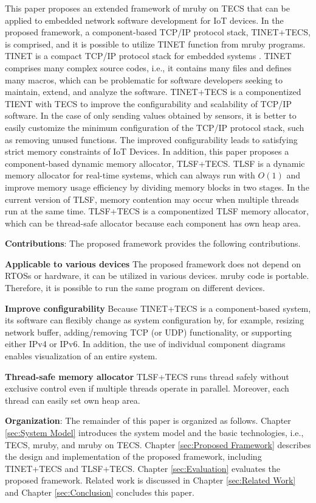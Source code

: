 \documentclass[a4j,12pt,oneside,openany,english]{jsbook}
\begin{document}
This paper proposes an extended framework of mruby on TECS that can be applied to embedded network software development for IoT devices.
In the proposed framework, a component-based TCP/IP protocol stack, TINET+TECS, is comprised, and it is possible to utilize TINET function from mruby programs.
TINET is a compact TCP/IP protocol stack for embedded systems \cite{url:TINET}.
TINET comprises many complex source codes, i.e., it contains many files and defines many macros, which can be problematic for software developers seeking to maintain, extend, and analyze the software.
TINET+TECS is a componentized TIENT with TECS to improve the configurability and scalability of TCP/IP software.
In the case of only sending values obtained by sensors, it is better to easily customize the minimum configuration of the TCP/IP protocol stack, such as removing unused functions.
The improved configurability leads to satisfying strict memory constraints of IoT Devices.
In addition, this paper proposes a component-based dynamic memory allocator, TLSF+TECS. 
TLSF is a dynamic memory allocator for real-time systems, which can always run with $O(1)$ and improve memory usage efficiency by dividing memory blocks in two stages.
In the current version of TLSF, memory contention may occur when multiple threads run at the same time.
TLSF+TECS is a componentized TLSF memory allocator, which can be thread-safe allocator because each component has own heap area.



{\bf Contributions}: The proposed framework provides the following contributions.

{\bf Applicable to various devices}
The proposed framework does not depend on RTOSs or hardware, it can be utilized in various devices.
mruby code is portable.
Therefore, it is possible to run the same program on different devices.

{\bf Improve configurability}
Because TINET+TECS is a component-based system, its software can flexibly change as system configuration by, for example, resizing network buffer, adding/removing TCP (or UDP) functionality, or supporting either IPv4 or IPv6.
In addition, the use of individual component diagrams enables visualization of an entire system.

{\bf Thread-safe memory allocator}
TLSF+TECS runs thread safely without exclusive control even if multiple threads operate in parallel.
Moreover, each thread can easily set own heap area.

{\bf Organization}: The remainder of this paper is organized as follows.
Chapter \ref{sec:System Model} introduces the system model and the basic technologies, i.e., TECS, mruby, and mruby on TECS.
Chapter \ref{sec:Proposed Framework} describes the design and implementation of the proposed framework, including TINET+TECS and TLSF+TECS.
Chapter \ref{sec:Evaluation} evaluates the proposed framework.
Related work is discussed in Chapter \ref{sec:Related Work} and Chapter \ref{sec:Conclusion} concludes this paper.
\end{document}
